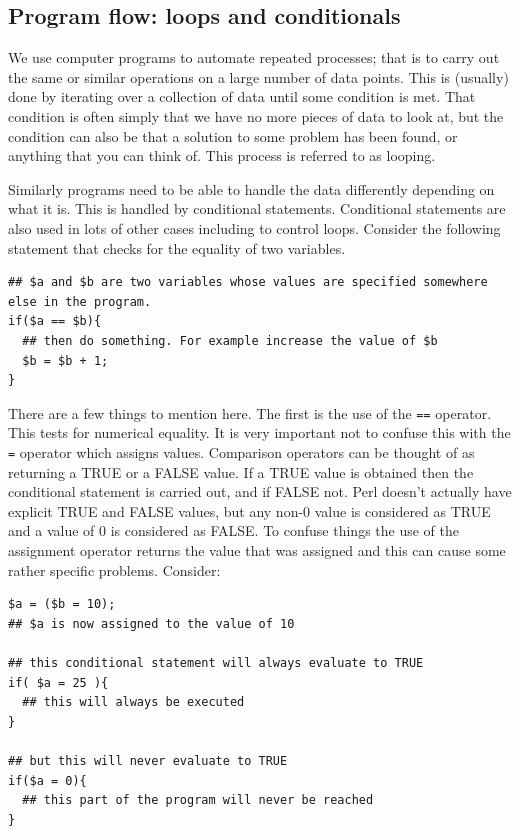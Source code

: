 \documentclass[11pt]{article}
\begin{document}
\subsection{Program flow: loops and conditionals}
\label{sec:orgheadline29}

We use computer programs to automate repeated processes; that is to
carry out the same or similar operations on a large number of data
points. This is (usually) done by iterating over a collection of data
until some condition is met. That condition is often simply that we have
no more pieces of data to look at, but the condition can also be that a
solution to some problem has been found, or anything that you can think
of. This process is referred to as looping.

Similarly programs need to be able to handle the data differently
depending on what it is. This is handled by conditional statements.
Conditional statements are also used in lots of other cases including to
control loops. Consider the following statement that checks for the
equality of two variables.

\begin{verbatim}
## $a and $b are two variables whose values are specified somewhere else in the program.
if($a == $b){
  ## then do something. For example increase the value of $b
  $b = $b + 1;
}
\end{verbatim}

There are a few things to mention here. The first is the use of the \texttt{==}
operator. This tests for numerical equality. It is very important not to
confuse this with the \texttt{=} operator which assigns values. Comparison
operators can be thought of as returning a TRUE or a FALSE value. If a
TRUE value is obtained then the conditional statement is carried out,
and if FALSE not. Perl doesn't actually have explicit TRUE and FALSE
values, but any non-0 value is considered as TRUE and a value of 0 is
considered as FALSE. To confuse things the use of the assignment
operator returns the value that was assigned and this can cause some
rather specific problems. Consider:

\begin{verbatim}
$a = ($b = 10);
## $a is now assigned to the value of 10

## this conditional statement will always evaluate to TRUE
if( $a = 25 ){
  ## this will always be executed
}

## but this will never evaluate to TRUE
if($a = 0){
  ## this part of the program will never be reached
}
\end{verbatim}
\end{document}
